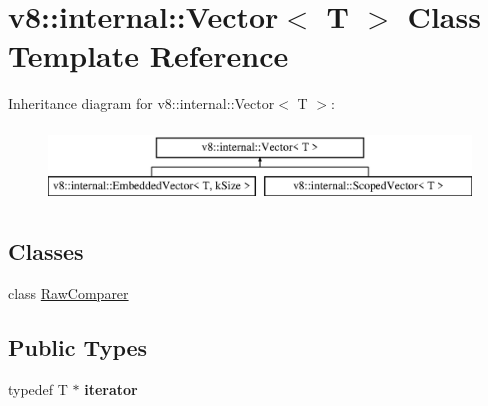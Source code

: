 \hypertarget{classv8_1_1internal_1_1_vector}{}\section{v8\+:\+:internal\+:\+:Vector$<$ T $>$ Class Template Reference}
\label{classv8_1_1internal_1_1_vector}
Inheritance diagram for v8\+:\+:internal\+:\+:Vector$<$ T $>$\+:\begin{figure}[H]
\begin{center}
\leavevmode
\includegraphics[height=2.000000cm]{classv8_1_1internal_1_1_vector}
\end{center}
\end{figure}
\subsection*{Classes}
\begin{DoxyCompactItemize}
\item 
class \hyperlink{classv8_1_1internal_1_1_vector_1_1_raw_comparer}{Raw\+Comparer}
\end{DoxyCompactItemize}
\subsection*{Public Types}
\begin{DoxyCompactItemize}
\item 
typedef T $\ast$ {\bfseries iterator}\hypertarget{classv8_1_1internal_1_1_vector_a4eb1bff96066fd7324ceb3a5c78a58de}{}\label{classv8_1_1internal_1_1_vector_a4eb1bff96066fd7324ceb3a5c78a58de}

\end{DoxyCompactItemize}
